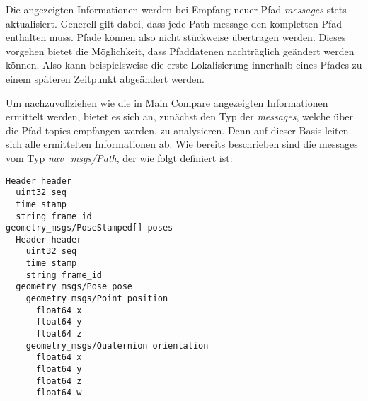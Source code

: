 Die angezeigten Informationen werden bei Empfang neuer Pfad \textit{messages} stets
aktualisiert. Generell gilt dabei, dass jede Path message den kompletten Pfad
enthalten muss. Pfade können also nicht stückweise übertragen werden. Dieses vorgehen
bietet die Möglichkeit, dass Pfaddatenen nachträglich geändert werden können.
Also kann beispielsweise die erste Lokalisierung innerhalb eines Pfades zu einem
späteren Zeitpunkt abgeändert werden. 

Um nachzuvollziehen wie die in Main Compare angezeigten Informationen ermittelt werden, bietet
es sich an, zunächst den Typ der \textit{messages}, welche über die Pfad topics
empfangen werden, zu analysieren. Denn auf dieser Basis leiten sich alle
ermittelten Informationen ab. Wie bereits beschrieben sind die messages vom Typ
\textit{nav\_msgs/Path}, der wie folgt definiert ist:

\begin{lstlisting}[caption=ROS transformation message, label=lst:pathmsgs]
Header header
  uint32 seq
  time stamp
  string frame_id
geometry_msgs/PoseStamped[] poses
  Header header
    uint32 seq
    time stamp
    string frame_id
  geometry_msgs/Pose pose
    geometry_msgs/Point position
      float64 x
      float64 y
      float64 z
    geometry_msgs/Quaternion orientation
      float64 x
      float64 y
      float64 z
      float64 w
\end{lstlisting}


